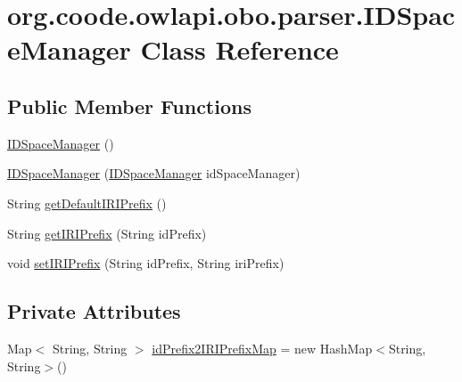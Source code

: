 \hypertarget{classorg_1_1coode_1_1owlapi_1_1obo_1_1parser_1_1_i_d_space_manager}{\section{org.\-coode.\-owlapi.\-obo.\-parser.\-I\-D\-Space\-Manager Class Reference}
\label{classorg_1_1coode_1_1owlapi_1_1obo_1_1parser_1_1_i_d_space_manager}
}
\subsection*{Public Member Functions}
\begin{DoxyCompactItemize}
\item 
\hyperlink{classorg_1_1coode_1_1owlapi_1_1obo_1_1parser_1_1_i_d_space_manager_adc576f5dce31f6e5db6706bbda37dbce}{I\-D\-Space\-Manager} ()
\item 
\hyperlink{classorg_1_1coode_1_1owlapi_1_1obo_1_1parser_1_1_i_d_space_manager_a4b683ba4ed86b877b2a95ef9a6591d88}{I\-D\-Space\-Manager} (\hyperlink{classorg_1_1coode_1_1owlapi_1_1obo_1_1parser_1_1_i_d_space_manager}{I\-D\-Space\-Manager} id\-Space\-Manager)
\item 
String \hyperlink{classorg_1_1coode_1_1owlapi_1_1obo_1_1parser_1_1_i_d_space_manager_a66ef16de3b55920e093d0923f3162b40}{get\-Default\-I\-R\-I\-Prefix} ()
\item 
String \hyperlink{classorg_1_1coode_1_1owlapi_1_1obo_1_1parser_1_1_i_d_space_manager_ada8762a11cd6e115995dde410e515e41}{get\-I\-R\-I\-Prefix} (String id\-Prefix)
\item 
void \hyperlink{classorg_1_1coode_1_1owlapi_1_1obo_1_1parser_1_1_i_d_space_manager_ac3ae8c35cdcabfafba5202d0b9b9a54d}{set\-I\-R\-I\-Prefix} (String id\-Prefix, String iri\-Prefix)
\end{DoxyCompactItemize}
\subsection*{Private Attributes}
\begin{DoxyCompactItemize}
\item 
Map$<$ String, String $>$ \hyperlink{classorg_1_1coode_1_1owlapi_1_1obo_1_1parser_1_1_i_d_space_manager_a20198478103c3e16aeaa3264ddf9e800}{id\-Prefix2\-I\-R\-I\-Prefix\-Map} = new Hash\-Map$<$String, String$>$()
\end{DoxyCompactItemize}


